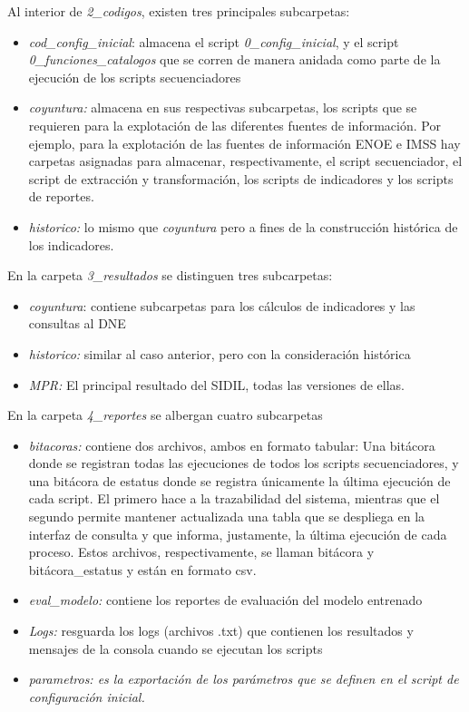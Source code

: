 \documentclass[
]{article}
\begin{document}
Al interior de \emph{2\_codigos}, existen tres principales subcarpetas:

\begin{itemize}
\item
  \emph{cod\_config\_inicial}: almacena el script \emph{0\_config\_inicial}, y el script \emph{0\_funciones\_catalogos} que se corren de manera anidada como parte de la ejecución de los scripts secuenciadores
\item
  \emph{coyuntura:} almacena en sus respectivas subcarpetas, los scripts que se requieren para la explotación de las diferentes fuentes de información. Por ejemplo, para la explotación de las fuentes de información ENOE e IMSS hay carpetas asignadas para almacenar, respectivamente, el script secuenciador, el script de extracción y transformación, los scripts de indicadores y los scripts de reportes.
\item
  \emph{historico:} lo mismo que \emph{coyuntura} pero a fines de la construcción histórica de los indicadores.
\end{itemize}

En la carpeta \emph{3\_resultados} se distinguen tres subcarpetas:

\begin{itemize}
\item
  \emph{coyuntura}: contiene subcarpetas para los cálculos de indicadores y las consultas al DNE
\item
  \emph{historico:} similar al caso anterior, pero con la consideración histórica
\item
  \emph{MPR:} El principal resultado del SIDIL, todas las versiones de ellas.
\end{itemize}

En la carpeta \emph{4\_reportes} se albergan cuatro subcarpetas

\begin{itemize}
\item
  \emph{bitacoras:} contiene dos archivos, ambos en formato tabular: Una bitácora donde se registran todas las ejecuciones de todos los scripts secuenciadores, y una bitácora de estatus donde se registra únicamente la última ejecución de cada script. El primero hace a la trazabilidad del sistema, mientras que el segundo permite mantener actualizada una tabla que se despliega en la interfaz de consulta y que informa, justamente, la última ejecución de cada proceso. Estos archivos, respectivamente, se llaman bitácora y bitácora\_estatus y están en formato csv.
\item
  \emph{eval\_modelo:} contiene los reportes de evaluación del modelo entrenado
\item
  \emph{Logs:} resguarda los logs (archivos .txt) que contienen los resultados y mensajes de la consola cuando se ejecutan los scripts
\item
  \emph{parametros: es la exportación de los parámetros que se definen en el script de configuración inicial.}
\end{itemize}
\end{document}
